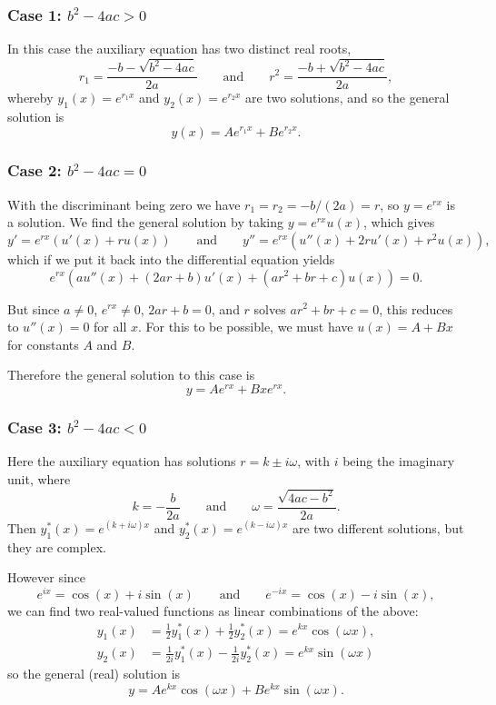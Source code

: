 \subsubsection*{Case 1: $b^2 - 4 a c > 0$}

In this case the auxiliary equation has two distinct real roots,
\[
	r_1 = \frac{- b - \sqrt{b^2 - 4 a c}}{2 a} \qquad \text{and} \qquad r^2 = \frac{- b + \sqrt{b^2 - 4 a c}}{2 a},
\]
whereby $y_1(x) = e^{r_1 x}$ and $y_2(x) = e^{r_2 x}$ are two solutions, and so the general solution is
\[
	y(x) = A e^{r_1 x} + B e^{r_2 x}.
\]

\subsubsection*{Case 2: $b^2 - 4 a c = 0$}

With the discriminant being zero we have $r_1 = r_2 = -b / (2a) = r$, so $y = e^{r x}$ is a solution. We find the general solution by taking $y = e^{r x} u(x)$, which gives
\[
	y' = e^{r x} (u'(x) + r u(x)) \qquad \text{and} \qquad y'' = e^{r x} (u''(x) + 2 r u'(x) + r^2 u(x)),
\]
which if we put it back into the differential equation yields
\[
	e^{r x} (a u''(x) + (2 a r + b) u'(x) + (a r^2 + b r + c) u(x)) = 0.
\]

\noindent
But since $a \neq 0$, $e^{r x} \neq 0$, $2 a r + b = 0$, and $r$ solves $a r^2 + b r + c = 0$, this reduces to $u''(x) = 0$ for all $x$. For this to be possible, we must have $u(x) = A + B x$ for constants $A$ and $B$.

Therefore the general solution to this case is
\[
	y = A e^{r x} + B x e^{r x}.
\]

\subsubsection*{Case 3: $b^2 - 4 a c < 0$}

Here the auxiliary equation has solutions $r = k \pm i \omega$, with $i$ being the imaginary unit, where
\[
	k = - \frac{b}{2 a} \qquad \text{and} \qquad \omega = \frac{\sqrt{4 a c - b^2}}{2 a}.
\]
Then $y_1^* (x) = e^{(k + i \omega) x}$ and $y_2^* (x) = e^{(k - i \omega) x}$ are two different solutions, but they are complex.

However since
\[
	e^{i x} = \cos(x) + i \sin(x) \qquad \text{and} \qquad e^{- i x} = \cos(x) - i \sin(x),
\]
we can find two real-valued functions as linear combinations of the above:
\begin{align*}
	y_1(x) &= \frac{1}{2} y_1^*(x) + \frac{1}{2} y_2^*(x) = e^{k x} \cos(\omega x), \\
	y_2(x) &= \frac{1}{2 i} y_1^*(x) - \frac{1}{2 i} y_2^*(x) = e^{k x} \sin(\omega x)
\end{align*}
so the general (real) solution is
\[
	y = A e^{k x} \cos(\omega x) + B e^{k x} \sin(\omega x).
\]

